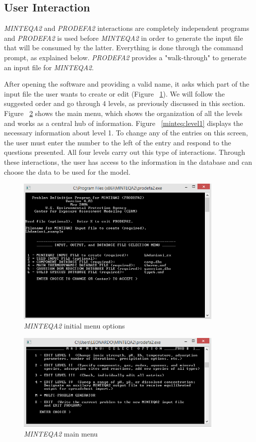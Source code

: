 \subsection{User Interaction}\label{minteq:interactions}
\emph{MINTEQA2} and \emph{PRODEFA2} interactions are completely independent programs and \emph{PRODEFA2} is used before \emph{MINTEQA2} in order to generate the input file that will be consumed by the latter. Everything is done through the command prompt, as explained below. \emph{PRODEFA2} provides a "walk-through" to generate an input file for \emph{MINTEQA2}.

After opening the software and providing a valid name, it asks which part of the input file the user wants to create or edit (Figure ~\ref{minteq:init}). We will follow the suggested order and go through 4 levels, as previously discussed in this section. Figure ~\ref{minteq:level0} shows the main menu, which shows the organization of all the levels and works as a central hub of information. Figure ~\ref{minteq:level1} displays the necessary information about level 1. To change any of the entries on this screen, the user must enter the number to the left of the entry and respond to the questions presented. All four levels carry out this type of interactions. Through these interactions, the user has access to the information in the database and can choose the data to be used for the model.

\begin{figure}[ht!]
\centering
\includegraphics[width=100mm]{figures/minteq-init.png}
\caption{\emph{MINTEQA2} initial menu options}
\label{minteq:init}
\end{figure}

\begin{figure}[ht!]
\centering
\includegraphics[width=100mm]{figures/minteq-level0.png}
\caption{\emph{MINTEQA2} main menu}
\label{minteq:level0}
\end{figure}

